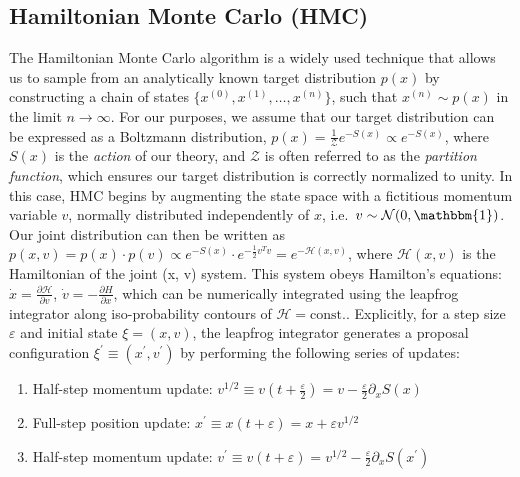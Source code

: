 \documentclass{article} %
\begin{document}
\subsection{\label{subsec:HMC}Hamiltonian Monte Carlo (HMC)}
%
The Hamiltonian Monte Carlo algorithm is a widely used technique that allows us to sample from an analytically known
target distribution \(p(x)\) by constructing a chain of states \(\{x^{(0)}, x^{(1)}, \ldots, x^{(n)}\}\), such that
\(x^{(n)}\sim p(x)\) in the limit \(n\rightarrow\infty\).
%
For our purposes, we assume that our target distribution can be expressed as a Boltzmann distribution, \(p(x) =
\tfrac{1}{\mathcal{Z}} e^{-S(x)}\propto e^{-S(x)}\), where \(S(x)\) is the \emph{action} of our theory, and
\(\mathcal{Z}\) is often referred to as the \emph{partition function}, which ensures our target distribution is
correctly normalized to unity.
%
In this case, HMC begins by augmenting the state space with a fictitious momentum variable \(v\), normally
distributed independently of \(x\), i.e.\ \(v\sim\mathcal{N}(0, \mathbbm{1})\).
%
Our joint distribution can then be written as \(%
   p(x, v) = p(x)\cdot p(v) \propto e^{-S(x)}\cdot e^{-\frac{1}{2}v^{T}v} = e^{-\mathcal{H}(x, v)}
\), where \(\mathcal{H}(x, v)\) is the Hamiltonian of the joint (x, v) system.
%
This system obeys Hamilton's equations: %
\(\dot{x} = \frac{\partial\mathcal{H}}{\partial v}\), \(\dot{v} = -\frac{\partial H}{\partial x}\), which can be 
numerically integrated using the leapfrog integrator along iso-probability contours of \(\mathcal{H} = \text{const.}\).
%
Explicitly, for a step size \(\varepsilon\) and initial state \(\xi = (x, v)\), the leapfrog integrator generates a
proposal configuration \(\xi^{\prime} \equiv (x^{\prime}, v^{\prime})\) by performing the following series of updates: 
%
\begin{enumerate}
   \item Half-step momentum update: \hspace{12pt}\(%
      v^{1/2} \equiv v{\left(t+\frac{\varepsilon}{2}\right)} = v-\frac{\varepsilon}{2}\partial_{x}S(x)
   \)
   \item Full-step position update: \hspace{36pt}\(%
      x^{\prime} \equiv x(t+\varepsilon) = x + \varepsilon v^{1/2}
   \)
   \item Half-step momentum update:
      \hspace{18pt} \(%
         v^{\prime} \equiv v(t+\varepsilon) = v^{1/2} - \frac{\varepsilon}{2}\partial_{x} S(x^{\prime})
   \)
\end{enumerate}
\end{document}
